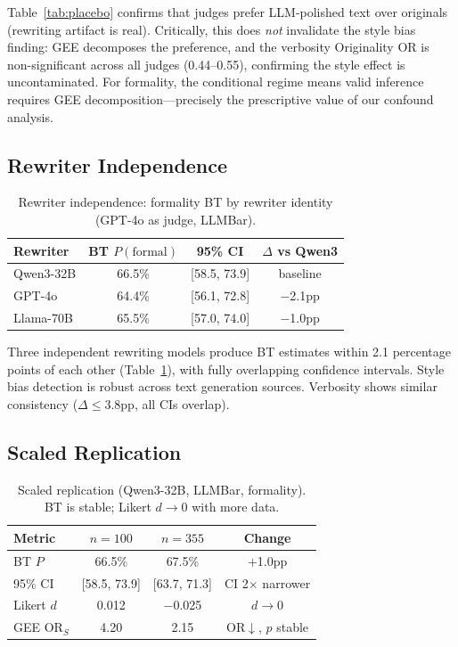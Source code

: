 \documentclass[11pt,twocolumn]{article}
\begin{document}
Table~\ref{tab:placebo} confirms that judges prefer LLM-polished text over originals (rewriting artifact is real). Critically, this does \emph{not} invalidate the style bias finding: GEE decomposes the preference, and the verbosity Originality OR is non-significant across all judges (0.44--0.55), confirming the style effect is uncontaminated. For formality, the conditional regime means valid inference requires GEE decomposition---precisely the prescriptive value of our confound analysis.

\subsection{Rewriter Independence}
\label{sec:rewriter}

\begin{table}[t]
\centering
\small
\caption{Rewriter independence: formality BT by rewriter identity (GPT-4o as judge, LLMBar).}
\label{tab:rewriter}
\begin{tabular}{@{}lccc@{}}
\toprule
Rewriter & BT $P(\text{formal})$ & 95\% CI & $\Delta$ vs Qwen3 \\
\midrule
Qwen3-32B & 66.5\% & [58.5, 73.9] & baseline \\
GPT-4o & 64.4\% & [56.1, 72.8] & $-$2.1pp \\
Llama-70B & 65.5\% & [57.0, 74.0] & $-$1.0pp \\
\bottomrule
\end{tabular}
\vspace{-2mm}
\end{table}

Three independent rewriting models produce BT estimates within 2.1 percentage points of each other (Table~\ref{tab:rewriter}), with fully overlapping confidence intervals. Style bias detection is robust across text generation sources. Verbosity shows similar consistency ($\Delta \leq 3.8$pp, all CIs overlap).

\subsection{Scaled Replication}
\label{sec:scaled}

\begin{table}[t]
\centering
\small
\caption{Scaled replication (Qwen3-32B, LLMBar, formality). BT is stable; Likert $d \to 0$ with more data.}
\label{tab:scaled}
\begin{tabular}{@{}lccc@{}}
\toprule
Metric & $n{=}100$ & $n{=}355$ & Change \\
\midrule
BT $P$ & 66.5\% & 67.5\% & $+$1.0pp \\
95\% CI & [58.5, 73.9] & [63.7, 71.3] & CI 2$\times$ narrower \\
Likert $d$ & 0.012 & $-$0.025 & $d \to 0$ \\
GEE OR$_S$ & 4.20 & 2.15 & OR$\downarrow$, $p$ stable \\
\bottomrule
\end{tabular}
\vspace{-2mm}
\end{table}
\end{document}

